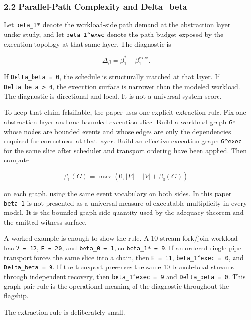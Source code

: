 \documentclass[
  11pt,
]{article}
\begin{document}
\subsubsection{2.2 Parallel-Path Complexity and
Delta\_beta}\label{parallel-path-complexity-and-delta_beta}

Let \texttt{beta\_1*} denote the workload-side path demand at the
abstraction layer under study, and let \texttt{beta\_1\^{}exec} denote
the path budget exposed by the execution topology at that same layer.
The diagnostic is

\[
\Delta_\beta = \beta_1^* - \beta_1^{\mathrm{exec}}.
\]

If \texttt{Delta\_beta\ =\ 0}, the schedule is structurally matched at
that layer. If \texttt{Delta\_beta\ \textgreater{}\ 0}, the execution
surface is narrower than the modeled workload. The diagnostic is
directional and local. It is not a universal system score.

To keep that claim falsifiable, the paper uses one explicit extraction
rule. Fix one abstraction layer and one bounded execution slice. Build a
workload graph \texttt{G*} whose nodes are bounded events and whose
edges are only the dependencies required for correctness at that layer.
Build an effective execution graph \texttt{G\^{}exec} for the same slice
after scheduler and transport ordering have been applied. Then compute

\[
\beta_1(G) = \max(0, |E| - |V| + \beta_0(G))
\]

on each graph, using the same event vocabulary on both sides. In this
paper \texttt{beta\_1} is not presented as a universal measure of
executable multiplicity in every model. It is the bounded graph-side
quantity used by the adequacy theorem and the emitted witness surface.

A worked example is enough to show the rule. A 10-stream fork/join
workload has \texttt{\textbar{}V\textbar{}\ =\ 12},
\texttt{\textbar{}E\textbar{}\ =\ 20}, and \texttt{beta\_0\ =\ 1}, so
\texttt{beta\_1*\ =\ 9}. If an ordered single-pipe transport forces the
same slice into a chain, then \texttt{\textbar{}E\textbar{}\ =\ 11},
\texttt{beta\_1\^{}exec\ =\ 0}, and \texttt{Delta\_beta\ =\ 9}. If the
transport preserves the same 10 branch-local streams through independent
recovery, then \texttt{beta\_1\^{}exec\ =\ 9} and
\texttt{Delta\_beta\ =\ 0}. This graph-pair rule is the operational
meaning of the diagnostic throughout the flagship.

The extraction rule is deliberately small.
\end{document}
